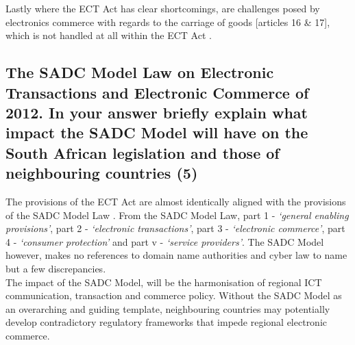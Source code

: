 \documentclass[11pt]{article}
\begin{document}
Lastly where the ECT Act \cite{rsa02_elect_comm_trans_act} has clear shortcomings,
are challenges posed by electronics commerce with regards to the carriage of
goods [articles 16 \& 17]\cite{un96_uncitral_model_law_ecomm}, which is not handled
at all within the ECT Act \cite{rsa02_elect_comm_trans_act}.

\subsection{The SADC Model Law on Electronic Transactions and Electronic Commerce of 2012. In your answer briefly explain what impact the SADC Model will have on the South African legislation and those of neighbouring countries (5)}
\label{sec:orge58a387}

The provisions of the ECT Act \cite{rsa02_elect_comm_trans_act} are almost
identically aligned with the provisions of the SADC Model Law
\cite{hipssa13_elec_trans_ecom_sadc_model_law}. From the SADC Model Law, part 1 -
\emph{`general enabling provisions'}, part 2 - \emph{`electronic transactions'}, part 3 -
\emph{`electronic commerce'}, part 4 - \emph{`consumer protection'} and part v - \emph{`service
providers'}. The SADC Model however, makes no references to domain name
authorities and cyber law to name but a few discrepancies.\\

The impact of the SADC Model, will be the harmonisation of regional ICT
communication, transaction and commerce policy. Without the SADC Model as an
overarching and guiding template, neighbouring countries may potentially develop
contradictory regulatory frameworks that impede regional electronic commerce.
\printbibliography
\end{document}
